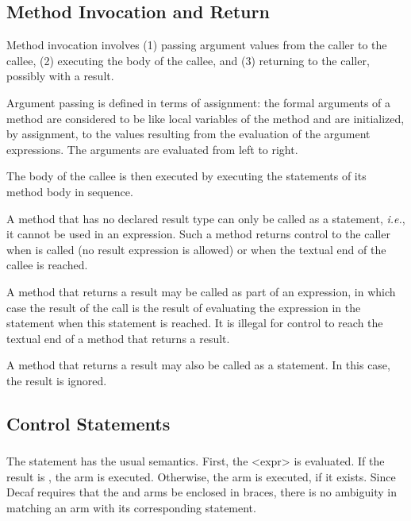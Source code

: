 \subsection*{Method Invocation and Return}

Method invocation involves (1) passing argument values from the caller
to the callee, (2) executing the body of the callee, and (3) returning
to the caller, possibly with a result.

Argument passing is defined in terms of assignment: the formal arguments
of a method are considered to be like local variables of the method and
are initialized, by assignment, to the values resulting from the
evaluation of the argument expressions.  The arguments are evaluated
from left to right.

The body of the callee is then executed by executing the statements of
its method body in sequence.

A method that has no declared result type can only be called as a
statement, {\em i.e.}, it cannot be used in an expression.  Such a
method returns control to the caller when  is called (no
result expression is allowed) or when the textual end of the callee is
reached.

A method that returns a result may be called as part of an expression,
in which case the result of the call is the result of evaluating the
expression in the  statement when this statement is reached.
It is illegal for control to reach the textual end of a method that
returns a result.

A method that returns a result may also be called as a statement.  In
this case, the result is ignored.

\subsection*{Control Statements}

\subsubsection*{}
The  statement has the usual semantics.  First, the {\bnf <expr>}
is evaluated.  If the result is , the  arm is
executed.  Otherwise, the  arm is executed, if it exists.
Since Decaf requires that the  and  arms
be enclosed in braces, there is no ambiguity in matching an 
arm with its corresponding  statement.


